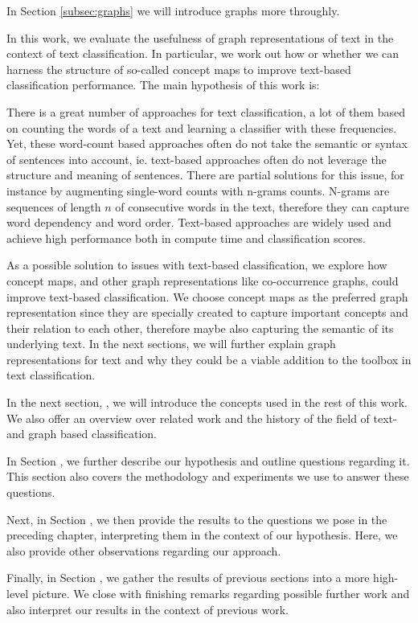 In Section \ref{subsec:graphs} we will introduce graphs more throughly.

In this work, we evaluate the usefulness of graph representations of text in the context of text classification. In particular, we work out how or whether we can harness the structure of so-called concept maps to improve text-based classification performance.
The main hypothesis of this work is:
\begin{quote}
\hypothesis
\end{quote}

There is a great number of approaches for text classification, a lot of them based on counting the words of a text and learning a classifier with these frequencies.
Yet, these word-count based approaches often do not take the semantic or syntax of sentences into account, ie. text-based approaches often do not leverage the structure and meaning of sentences.
There are partial solutions for this issue, for instance by augmenting single-word counts with n-grams counts.
N-grams are sequences of length $n$ of consecutive words in the text, therefore they can capture word dependency and word order.
Text-based approaches are widely used and achieve high performance both in compute time and classification scores.

As a possible solution to issues with text-based classification, we explore how concept maps, and other graph representations like co-occurrence graphs, could improve text-based classification.
We choose concept maps as the preferred graph representation since they are specially created to capture important concepts and their relation to each other, therefore maybe also capturing the semantic of its underlying text.
In the next sections, we will further explain graph representations for text and why they could be a viable addition to the toolbox in text classification.

In the next section, , we will introduce the concepts used in the rest of this work.
We also offer an overview over related work and the history of the field of text- and graph based classification.

In Section , we further describe our hypothesis and outline questions regarding it. This section also covers the methodology and experiments we use to answer these questions.

Next, in Section , we then provide the results to the questions we pose in the preceding chapter, interpreting them in the context of our hypothesis.
Here, we also provide other observations regarding our approach.

Finally, in Section , we gather the results of previous sections into a more high-level picture.
We close with finishing remarks regarding possible further work and also interpret our results in the context of previous work.